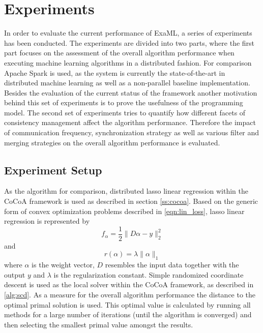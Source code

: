 
\chapter{Experiments}
\label{c:experiments}
In order to evaluate the current performance of ExaML, a series of experiments has been conducted.
The experiments are divided into two parts, where the first part focuses on the assessment of the overall algorithm performance when executing machine learning algorithms in a distributed fashion.
For comparison Apache Spark is used, as the system is currently the state-of-the-art in distributed machine learning as well as a non-parallel baseline implementation.
Besides the evaluation of the current status of the framework another motivation behind this set of experiments is to prove the usefulness of the programming model.
The second set of experiments tries to quantify how different facets of consistency management affect the algorithm performance.
Therefore the impact of communication frequency, synchronization strategy as well as various filter and merging strategies on the overall algorithm performance is evaluated.

\section{Experiment Setup}
As the algorithm for comparison, distributed lasso linear regression within the CoCoA framework is used as described in section \ref{ss:cocoa}.
Based on the generic form of convex optimization problems described in \eqref{eqn:lin_loss}, lasso linear regression is represented by
\begin{equation}
f_\alpha = \frac{1}{2} \parallel D\alpha - y \parallel^2_2
\label{eqn:lasso}
\end{equation}
and
\begin{equation}
r(\alpha) = \lambda \parallel \alpha \parallel_1
\label{eqn:lasso_reg}
\end{equation}
where $\alpha$ is the weight vector, $D$ resembles the input data together with the output $y$ and $\lambda$ is the regularization constant.
Simple randomized coordinate descent is used as the local solver within the CoCoA framework, as described in \eqref{alg:scd}.
As a measure for the overall algorithm performance the distance to the optimal primal solution is used. This optimal value is calculated by running all methods for a large number of iterations (until the algorithm is converged) and then selecting the smallest primal value amongst the results.


